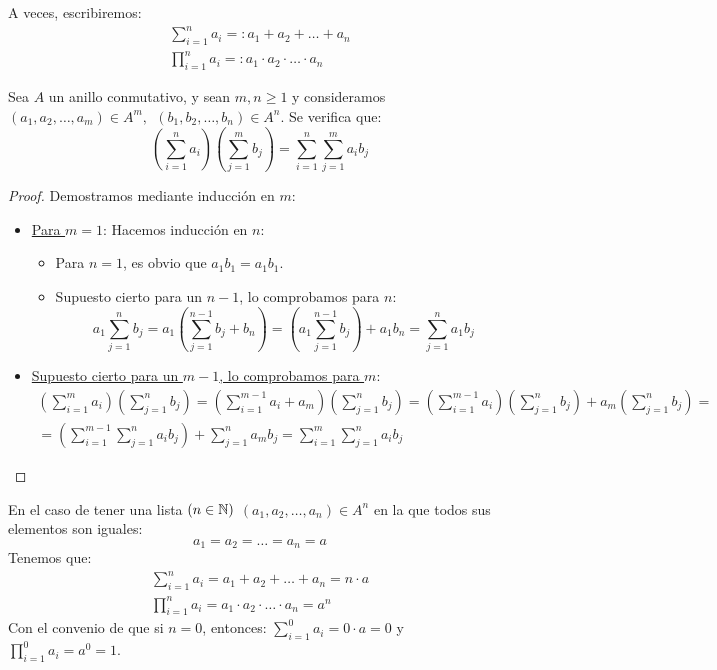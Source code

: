 \begin{notacion}
    A veces, escribiremos:
    \begin{gather*}
        \sum_{i=1}^n a_i =: a_1 + a_2 + \ldots + a_n\\
        \prod_{i=1}^n a_i =: a_1 \cdot a_2 \cdot \ldots \cdot a_n
    \end{gather*}
\end{notacion}

\begin{prop}
    Sea $A$ un anillo conmutativo, y sean $m,n \geq 1$ y consideramos
    $(a_1, a_2, \ldots, a_m) \in A^m,~~(b_1, b_2, \ldots, b_n) \in A^n$. Se verifica que:
    $$\left( \sum_{i=1}^n a_i \right) \left( \sum_{j=1}^m b_j \right) = \sum_{i=1}^n \sum_{j=1}^m a_i b_j$$
\end{prop}
\begin{proof}
    Demostramos mediante inducción en $m$:
    \begin{itemize}
        \item \underline{Para $m=1$}: Hacemos inducción en $n$:
        \begin{itemize}
            \item Para $n=1$, es obvio que $a_1b_1 = a_1b_1$.
            \item Supuesto cierto para un $n-1$, lo comprobamos para $n$:
            $$a_1 \sum_{j=1}^n b_j = a_1 \left( \sum_{j=1}^{n-1} b_j + b_n \right) = \left( a_1 \sum_{j=1}^{n-1} b_j \right) + a_1b_n = \sum_{j=1}^n a_1b_j$$
        \end{itemize}
        \item \underline{Supuesto cierto para un $m-1$, lo comprobamos para $m$}:
    \begin{multline*}
        \left(\sum_{i=1}^m a_i\right) \left(\sum_{j=1}^n b_j\right)
        = \left(\sum_{i=1}^{m-1}a_i + a_m\right) \left(\sum_{j=1}^n b_j\right)
        = \left(\sum_{i=1}^{m-1} a_i\right)\left(\sum_{j=1}^n b_j\right) + a_m \left(\sum_{j=1}^n b_j\right) =\\
        = \left(\sum_{i=1}^{m-1} \sum_{j=1}^n a_i b_j \right) + \sum_{j=1}^n a_mb_j = \sum_{i=1}^m \sum_{j=1}^n a_i b_j
    \end{multline*}
    \end{itemize}
\end{proof}

En el caso de tener una lista $(n \in \mathbb N)$ $(a_1, a_2, \ldots, a_n) \in A^n$ en la que todos sus elementos son iguales:
$$a_1 = a_2 = \ldots = a_n = a$$
Tenemos que:
\begin{gather*}
    \sum_{i=1}^n a_i = a_1 + a_2 + \ldots + a_n = n\cdot a\\
    \prod_{i=1}^n a_i = a_1 \cdot a_2 \cdot \ldots \cdot a_n = a^n
\end{gather*}
Con el convenio de que si $n = 0$, entonces: $\sum\limits_{i=1}^0 a_i = 0 \cdot a = 0$ y $\prod\limits_{i=1}^0 a_i = a^0 = 1$.


